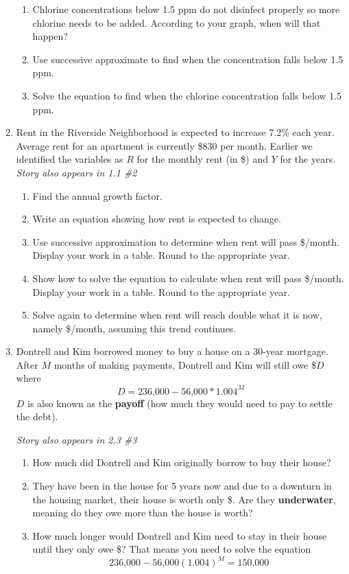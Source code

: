 \begin{enumerate}
\begin{enumerate}
\item Chlorine concentrations below 1.5 ppm do not disinfect properly so more chlorine needs to be added.  According to your graph, when will that happen? \vfill
\item Use successive approximate to find when the concentration falls below 1.5 ppm.  \vfill
\item Solve the equation to find when the chlorine concentration falls below 1.5 ppm.  \vfill
\end{enumerate} 

\newpage %

\item Rent in the Riverside Neighborhood is expected to increase 7.2\% each year.  Average rent for an apartment is currently \$830 per month.  Earlier we identified the variables as $R$ for the monthly rent  (in \$) and $Y$ for the years.
\hfill \emph{Story also appears in 1.1 \#2} 
\begin{enumerate}
\item Find the annual growth factor. \vfill
\item Write an equation showing how rent is expected to change. \vfill
\item Use successive approximation to determine when rent will pass \$/month.  Display your work in a table.  Round to the appropriate year. \vfill \vfill
\item Show how to solve the equation to calculate when rent will pass \$/month.  Display your work in a table.  Round to the appropriate year. \vfill \vfill
\item Solve again to determine when rent will reach double what it is now, namely  \$/month, assuming this trend continues. \vfill \vfill
\end{enumerate} 

\newpage %

\item Dontrell and Kim borrowed money to buy a house on a 30-year mortgage.  After $M$ months of making payments, Dontrell and Kim will still owe \$$D$ where $$D=\text{236,000}-\text{56,000} \ast 1.004^M$$  
$D$ is also known as the \textbf{payoff} (how much they would need to pay to settle the debt).

 \hfill \emph{Story also appears in 2.3 \#3}
 \begin{enumerate}
\item How much did Dontrell and Kim originally borrow to buy their house?   \vfill
\item They have been in the house for 5 years now and due to a downturn in the housing market, their house is worth only \$.   Are they \textbf{underwater}, meaning do they owe more than the house is worth? \vfill
\item How much longer would Dontrell and Kim need to stay in their house until they only owe \$?  That means you need to solve the equation $$\text{236,000}-\text{56,000}(1.004)^M=\text{150,000}$$
 \vfill \vfill
\end{enumerate}


\end{enumerate}
